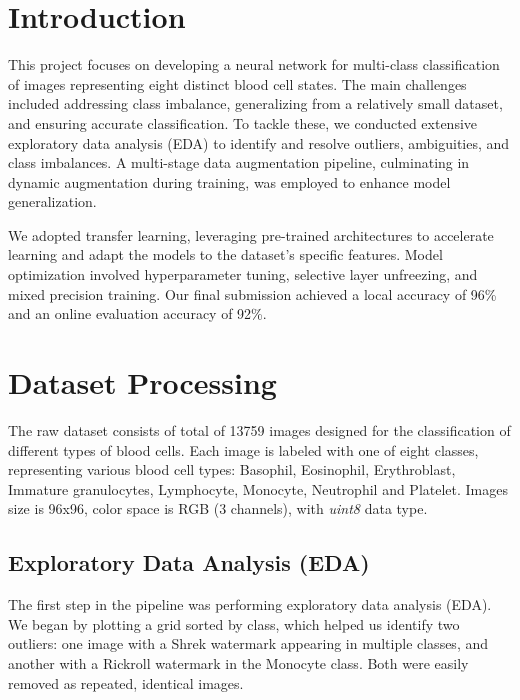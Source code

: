 \documentclass[11pt]{article}
\begin{document}
    \begin{multicols}{2}

        \section{Introduction}
        
        This project\cite{lecun2015deep}\cite{polimi_2024_2025} focuses on developing a neural network for multi-class classification of images representing eight distinct blood cell states. The main challenges included addressing class imbalance, generalizing from a relatively small dataset, and ensuring accurate classification. To tackle these, we conducted extensive exploratory data analysis (EDA) to identify and resolve outliers, ambiguities, and class imbalances. A multi-stage data augmentation pipeline, culminating in dynamic augmentation during training, was employed to enhance model generalization.

        We adopted transfer learning, leveraging pre-trained architectures to accelerate learning and adapt the models to the dataset's specific features. Model optimization involved hyperparameter tuning, selective layer unfreezing, and mixed precision training. Our final submission achieved a local accuracy of 96\% and an online evaluation accuracy of 92\%.
        
        \section{Dataset Processing}
        The raw dataset consists of total of 13759 images designed for the classification of different types of blood cells. Each image is labeled with one of eight classes, representing various blood cell types: Basophil, Eosinophil, Erythroblast, Immature granulocytes, Lymphocyte, Monocyte, Neutrophil and Platelet.
        Images size is 96x96, color space is RGB (3 channels), with \textit{uint8} data type.
        
        \subsection{Exploratory Data Analysis (EDA)}

        The first step in the pipeline was performing exploratory data analysis (EDA). We began by plotting a grid sorted by class, which helped us identify two outliers: one image with a Shrek watermark appearing in multiple classes, and another with a Rickroll watermark in the Monocyte class. Both were easily removed as repeated, identical images.
        

\end{multicols}
\end{document}
